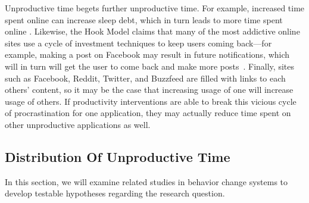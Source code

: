 Unproductive time begets further unproductive time. For example, increased time spent online can increase sleep debt, which in turn leads to more time spent online \cite{Mark:2016:SDS:2858036.2858437}. Likewise, the Hook Model claims that many of the most addictive online sites use a cycle of investment techniques to keep users coming back---for example, making a post on Facebook may result in future notifications, which will in turn will get the user to come back and make more posts~\cite{eyal2014hooked}. Finally, sites such as Facebook, Reddit, Twitter, and Buzzfeed are filled with links to each others' content, so it may be the case that increasing usage of one will increase usage of others. If productivity interventions are able to break this vicious cycle of procrastination for one application, they may actually reduce time spent on other unproductive applications as well.



\subsection{Distribution Of Unproductive Time}


In this section, we will examine related studies in behavior change systems to develop testable hypotheses regarding the research question.


